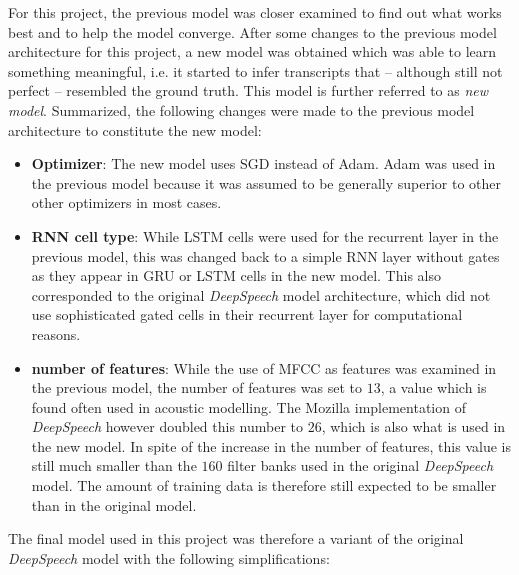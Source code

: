 For this project, the previous model was closer examined to find out what works best and to help the model converge. After some changes to the previous model architecture for this project, a new model was obtained which was able to learn something meaningful, i.e. it started to infer transcripts that -- although still not perfect -- resembled the ground truth. This model is further referred to as \textit{new model}. Summarized, the following changes were made to the previous model architecture to constitute the new model:

\begin{itemize}
	\item \textbf{Optimizer}: The new model uses \ac{SGD} instead of Adam. Adam was used in the previous model because it was assumed to be generally superior to other other optimizers in most cases.
	\item \textbf{RNN cell type}: While \ac{LSTM} cells were used for the recurrent layer in the previous model, this was changed back to a simple RNN layer without gates as they appear in \ac{GRU} or \ac{LSTM} cells in the new model. This also corresponded to the original \textit{DeepSpeech} model architecture, which did not use sophisticated gated cells in their recurrent layer for computational reasons.
	\item \textbf{number of features}: While the use of \ac{MFCC} as features was examined in the previous model, the number of features was set to $13$, a value which is found often used in acoustic modelling. The Mozilla implementation of \textit{DeepSpeech} however doubled this number to $26$, which is also what is used in the new model. In spite of the increase in the number of features, this value is still much smaller than the $160$ filter banks used in the original \textit{DeepSpeech} model. The amount of training data is therefore still expected to be smaller than in the original model.
\end{itemize}

The final model used in this project was therefore a variant of the original \textit{DeepSpeech} model with the following simplifications:

